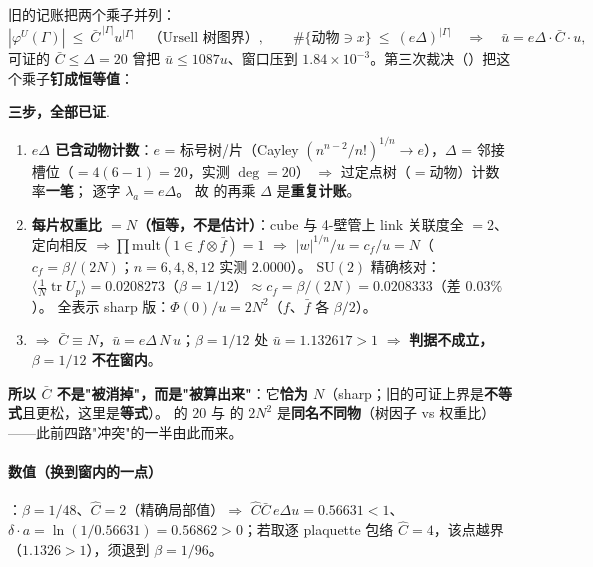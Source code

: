 旧的记账把两个乘子并列：
\[
|\varphi^U(\Gamma)|\ \le\ \bar C^{\,|\Gamma|}u^{|\Gamma|}
\quad\text{（Ursell 树图界）},\qquad
\#\{\text{动物} \ni x\}\ \le\ (e\Delta)^{|\Gamma|}
\quad\Longrightarrow\quad
\bar u=e\Delta\cdot\bar C\cdot u ,
\]
可证的 $\bar C\le\Delta=20$ 曾把 $\bar u\le1087u$、窗口压到 $1.84\times10^{-3}$。第三次裁决（）把这个乘子\textbf{钉成恒等值}：

\begin{keybox}
\textbf{三步，全部已证}.\LT
\begin{enumerate}[label=(\roman*)]
\item \textbf{$e\Delta$ 已含动物计数}：$e$ = 标号树/片（Cayley $(n^{n-2}/n!)^{1/n}\to e$），$\Delta$ = 邻接槽位（$=4(6-1)=20$，实测 $\deg=20$）
$\Rightarrow$ 过定点树（$=$动物）计数率\textbf{一笔}； 逐字 $\lambda_a=e\Delta$。
故  的再乘 $\Delta$ 是\textbf{重复计账}。
\item \textbf{每片权重比 $=N$（恒等，不是估计）}：cube 与 4-壁管上 link 关联度全 $=2$、定向相反 $\Rightarrow\prod\mathrm{mult}(1\in f\otimes\bar f)=1$
$\Rightarrow$ $|w|^{1/n}/u=c_f/u=N$（$c_f=\beta/(2N)$；$n=6,4,8,12$ 实测 $2.0000$）。
$\mathrm{SU}(2)$ 精确核对：$\langle\tfrac1N\operatorname{tr}U_p\rangle=0.0208273$（$\beta=1/12$）$\approx c_f=\beta/(2N)=0.0208333$（差 $0.03\%$）。
全表示 sharp 版：$\Phi(0)/u=2N^2$（$f$、$\bar f$ 各 $\beta/2$）。
\item $\Rightarrow$ \textbf{$\bar C\equiv N$}，$\bar u=e\Delta\,N\,u$；$\beta=1/12$ 处 $\bar u=1.132617>1$ $\Rightarrow$ \textbf{判据不成立，$\beta=1/12$ 不在窗内}。
\end{enumerate}
\end{keybox}

\textbf{所以 $\bar C$ 不是"被消掉"，而是"被算出来"}：它\textbf{恰为 $N$}（sharp；旧的可证上界是\textbf{不等式}且更松，这里是\textbf{等式}）。
 的 $20$ 与  的 $2N^2$ 是\textbf{同名不同物}（树因子 vs 权重比）——此前四路"冲突"的一半由此而来。

\paragraph{数值（换到窗内的一点）}：$\beta=1/48$、$\hat C=2$（精确局部值）$\Rightarrow$ $\hat C\bar C\,e\Delta u=0.56631<1$、
$\delta\cdot a=\ln(1/0.56631)=0.56862>0$；若取逐 plaquette 包络 $\hat C=4$，该点越界（$1.1326>1$），须退到 $\beta=1/96$。\LE
{}

